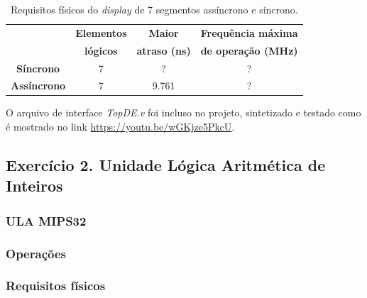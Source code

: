 \documentclass[12pt]{article}
\begin{document}

\begin{table}[H]
	\centering
	\begin{tabular}{|c|c|c|c|}
		\hline
		& \textbf{Elementos} & \textbf{Maior} & \textbf{Frequência máxima} \\
		& \textbf{lógicos} & \textbf{atraso (ns)} & \textbf{de operação (MHz)} \\\hline
		\hline
		\textbf{Síncrono} & 7 & ? & ? \\\hline
		\textbf{Assíncrono} & 7 & 9.761 & ? \\\hline
	\end{tabular}
	\caption{Requisitos físicos do \textit{display} de 7 segmentos assíncrono e síncrono.}
	\label{tab:req1}
\end{table}

O arquivo de interface \textit{TopDE.v} foi incluso no projeto, sintetizado e testado como é mostrado no link \url{https://youtu.be/wGKjze5PkcU}.

\subsection{Exercício 2. Unidade Lógica Aritmética de Inteiros}
\label{subsec:ulaint}

\subsubsection{ULA MIPS32}
\label{subsubsec:ulamips32}


\subsubsection{Operações}
\label{subsubsec:2op}


\subsubsection{Requisitos físicos}
\label{subsubsec:ulafis}

\end{document}
